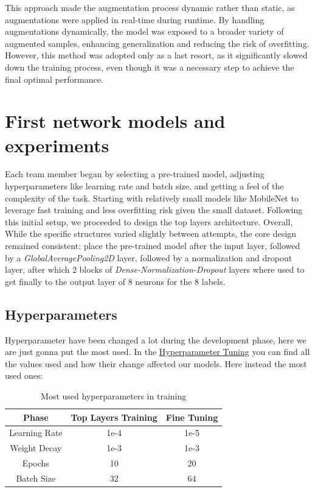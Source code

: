 \documentclass[11pt]{article}
\begin{document}
This approach made the augmentation process dynamic rather than static, as augmentations were applied in real-time during runtime. By handling augmentations dynamically, the model was exposed to a broader variety of augmented samples, enhancing generalization and reducing the risk of overfitting. However, this method was adopted only as a last resort, as it significantly slowed down the training process, even though it was a necessary step to achieve the final optimal performance.

\section{First network models and experiments}
Each team member began by selecting a pre-trained model, adjusting hyperparameters like learning rate and batch size, and getting a feel of the complexity of the task.
Starting with relatively small models like MobileNet to leverage fast training and less overfitting risk given the small dataset. 
Following this initial setup, we proceeded to design the top layers architecture. Overall, While the specific structures varied slightly between attempts, the core design remained consistent: place the pre-trained model after the input layer, followed by a \textit{GlobalAveragePooling2D} layer, followed by a normalization and dropout layer, after which 2 blocks of \textit{Dense-Normalization-Dropout} layers where used to get finally to the output layer of 8 neurons for the 8 labels.
\subsection{Hyperparameters}
Hyperparameter have been changed a lot during the development phase, here we are just gonna put the most used. In the \hyperref[hyperparametertuning]{Hyperparameter Tuning} you can find all the values used and how their change affected our models.
Here instead the most used ones:\\
\begin{table}[h!]
\centering
\begin{tabular}{|c|c|c|}
\hline
\textbf{Phase} & \textbf{Top Layers Training} & \textbf{Fine Tuning} \\ \hline
Learning Rate & 1e-4 & 1e-5 \\ \hline
Weight Decay & 1e-3 & 1e-3 \\ \hline
Epochs & 10 & 20 \\ \hline
Batch Size & 32 & 64 \\ \hline
\end{tabular}
\caption{Most used hyperparameters in training}
\end{table}
\end{document}
